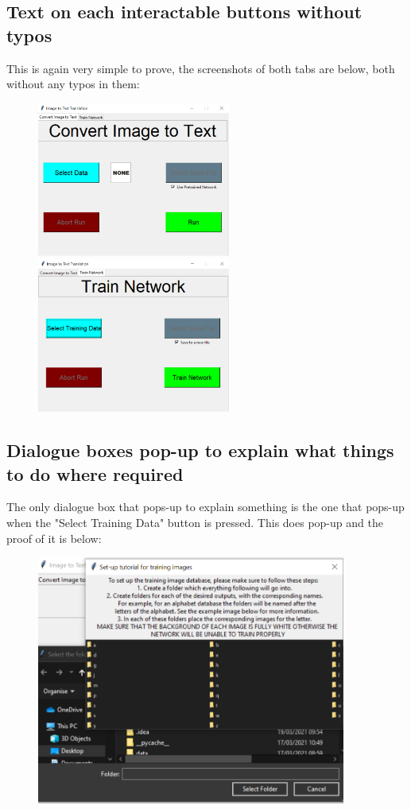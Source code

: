 \documentclass{report}
\begin{document}
\subsection{Text on each interactable buttons without typos}
This is again very simple to prove, the screenshots of both tabs are below, both without any typos in them:
\begin{figure}[H]
    \centering
    \includegraphics[width=2.5in]{Images/Evaluation/Success Criteria Proof/Convert Image to Text Tab screenshot.png}
    \includegraphics[width=2.5in]{Images/Evaluation/Success Criteria Proof/Train Network Tab screenshot.png}
\end{figure}
\newpage
\subsection{Dialogue boxes pop-up to explain what things to do where required}
The only dialogue box that pops-up to explain something is the one that pops-up when the "Select Training Data" button is pressed. This does pop-up and the proof of it is below:
\begin{figure}[H]
    \centering
    \includegraphics[width=4in]{Images/Evaluation/Success Criteria Proof/Dialogue Boxes.png}
\end{figure}
\end{document}
